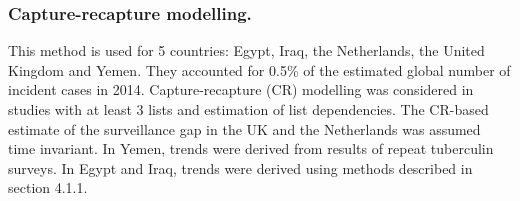 \subsubsection {Capture-recapture modelling.} This method is used for 5 countries: Egypt\cite{20487611}, Iraq\cite{23485379}, the Netherlands\cite{17156496}, the United Kingdom\cite{Anderson2010} and Yemen\cite{23485378}. They accounted for 0.5\% of the estimated global number of incident cases in 2014. Capture-recapture (CR) modelling was considered in studies with at least 3 lists and estimation of list dependencies\cite{WHO2012}. The CR-based estimate of the surveillance gap in the UK and the Netherlands was assumed time invariant. In Yemen, trends were derived from results of repeat tuberculin surveys\cite{19723398}. In Egypt and Iraq, trends were derived using methods described in section 4.1.1.

